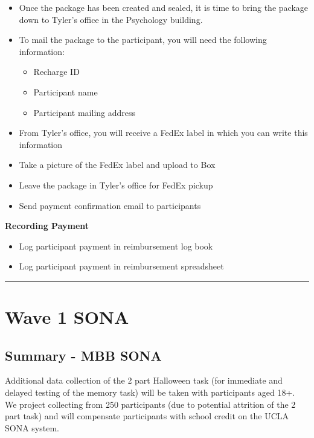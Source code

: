\documentclass[]{book}
\providecommand{\tightlist}{%
  \setlength{\itemsep}{0pt}\setlength{\parskip}{0pt}}
\begin{document}
\begin{itemize}
\tightlist
\item
  Once the package has been created and sealed, it is time to bring the package down to Tyler's office in the Psychology building.
\item
  To mail the package to the participant, you will need the following information:

  \begin{itemize}
  \tightlist
  \item
    Recharge ID
  \item
    Participant name
  \item
    Participant mailing address
  \end{itemize}
\item
  From Tyler's office, you will receive a FedEx label in which you can write this information
\item
  Take a picture of the FedEx label and upload to Box
\item
  Leave the package in Tyler's office for FedEx pickup
\item
  Send payment confirmation email to participants
\end{itemize}

\textbf{Recording Payment}

\begin{itemize}
\tightlist
\item
  Log participant payment in reimbursement log book
\item
  Log participant payment in reimbursement spreadsheet
\end{itemize}

\begin{center}\rule{0.5\linewidth}{0.5pt}\end{center}

\hypertarget{wave-1-sona}{%
\chapter{Wave 1 SONA}\label{wave-1-sona}}

\hypertarget{summary---mbb-sona}{%
\section{Summary - MBB SONA}\label{summary---mbb-sona}}

Additional data collection of the 2 part Halloween task (for immediate and delayed testing of the memory task) will be taken with participants aged 18+. We project collecting from 250 participants (due to potential attrition of the 2 part task) and will compensate participants with school credit on the UCLA SONA system.
\end{document}
